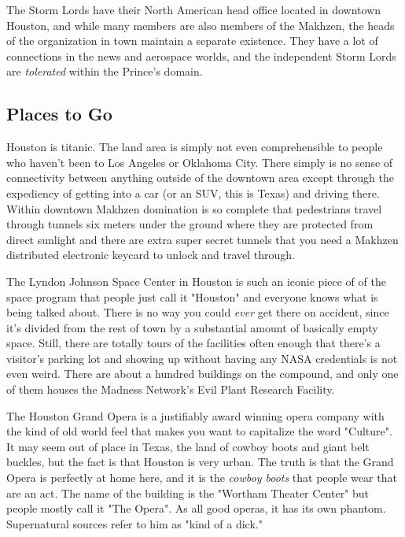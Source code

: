 The Storm Lords have their North American head office located in downtown Houston, and while many members are also members of the Makhzen, the heads of the organization in town maintain a separate existence. They have a lot of connections in the news and aerospace worlds, and the independent Storm Lords are \textit{tolerated} within the Prince's domain.

\subsection{Places to Go}

\hspace{\parindent} Houston is titanic. The land area is simply not even comprehensible to people who haven't been to Los Angeles or Oklahoma City. There simply is no sense of connectivity between anything outside of the downtown area except through the expediency of getting into a car (or an SUV, this is Texas) and driving there. Within downtown Makhzen domination is so complete that pedestrians travel through tunnels six meters under the ground where they are protected from direct sunlight and there are extra super secret tunnels that you need a Makhzen distributed electronic keycard to unlock and travel through.

The Lyndon Johnson Space Center in Houston is such an iconic piece of of the space program that people just call it "Houston" and everyone knows what is being talked about. There is no way you could \textit{ever} get there on accident, since it's divided from the rest of town by a substantial amount of basically empty space. Still, there are totally tours of the facilities often enough that there's a visitor's parking lot and showing up without having any NASA credentials is not even weird. There are about a hundred buildings on the compound, and only one of them houses the Madness Network's Evil Plant Research Facility.

The Houston Grand Opera is a justifiably award winning opera company with the kind of old world feel that makes you want to capitalize the word "Culture". It may seem out of place in Texas, the land of cowboy boots and giant belt buckles, but the fact is that Houston is very urban. The truth is that the Grand Opera is perfectly at home here, and it is the \textit{cowboy boots} that people wear that are an act. The name of the building is the "Wortham Theater Center" but people mostly call it "The Opera". As all good operas, it has its own phantom. Supernatural sources refer to him as "kind of a dick."

